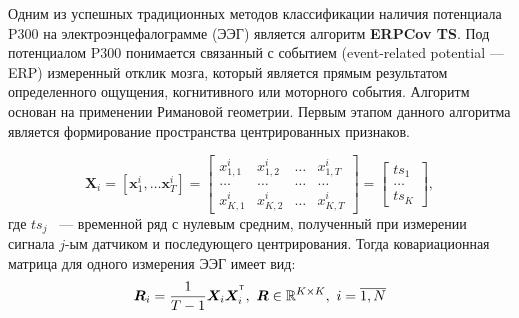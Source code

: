 \documentclass[a4paper, 12pt]{extarticle}
\begin{document}
Одним из успешных традиционных методов классификации наличия потенциала P300 на электроэнцефалограмме (ЭЭГ) является
алгоритм \textbf{ERPCov TS}. Под потенциалом P300 понимается связанный с 
событием (event-related potential — ERP) измеренный отклик мозга, 
который является прямым результатом определенного ощущения, 
когнитивного или моторного события.
Алгоритм основан на применении Римановой геометрии\citep{barachant2010riemannian}. 
Первым этапом данного алгоритма является формирование пространства центрированных признаков.

\begin{equation*}
	\bm{X}_i= \left[\bm{x}^i_1,\dots \bm{x}^i_{T}\right] = 
	\begin{bmatrix}
	x^i_{1,1} & x^i_{1,2} &  \dots  &  x^i_{1,T}\\
	\dots & \dots &  \dots  &  \dots\\
	x^i_{K,1} & x^i_{K,2} &  \dots  &  x^i_{K,T}
	\end{bmatrix}
	= \begin{bmatrix}
		ts_1\\
		\dots\\
		ts_K
		\end{bmatrix},
	\end{equation*}
где $ts_j$ ~--- временной ряд с нулевым средним, полученный при измерении сигнала $j$-ым датчиком и последующего центрирования.
Тогда ковариационная матрица для одного измерения ЭЭГ имеет вид:
$$\bm{R}_i = \dfrac{1}{T-1}\bm{X}_i\bm{X}_i^{^{\mathsf{T}}}, ~\bm{R} \in \mathbb{R}^{K\times K},~i = \overline{1, N}$$
\end{document}
